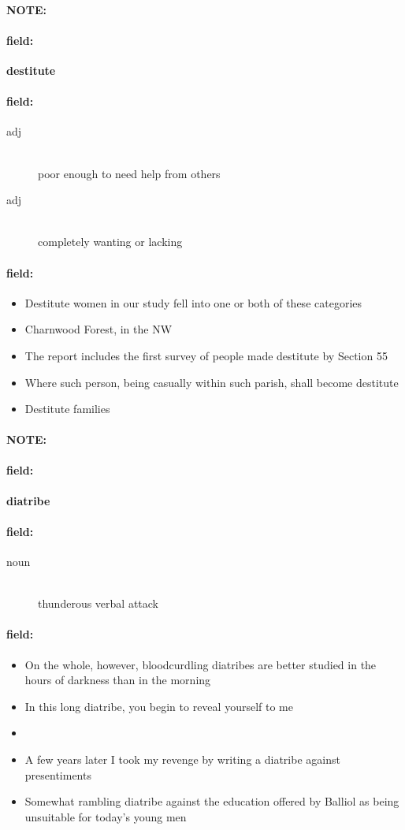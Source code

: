 \documentclass[12pt]{article}
\newenvironment{note}{\paragraph{NOTE:}}{}
\newenvironment{field}{\paragraph{field:}}{}
\begin{document}
\begin{note}
\begin{field}
\textbf{\large destitute}
\end{field}


\begin{field}
\begin{description}
\item[adj] \hfill \\ 
poor enough to need help from others

\item[adj] \hfill \\ 
completely wanting or lacking

\end{description}
\end{field}

\begin{field}
\begin{itemize}
\item Destitute women in our study fell into one or both of these categories
\item Charnwood Forest, in the NW
\item The report includes the first survey of people made destitute by Section 55
\item Where such person, being casually within such parish, shall become destitute
\item Destitute families
\end{itemize}
\end{field}
\end{note}
\begin{note}
\begin{field}
\textbf{\large diatribe}
\end{field}


\begin{field}
\begin{description}
\item[noun] \hfill \\ 
thunderous verbal attack

\end{description}
\end{field}

\begin{field}
\begin{itemize}
\item On the whole, however, bloodcurdling diatribes are better studied in the hours of darkness than in the morning
\item In this long diatribe, you begin to reveal yourself to me
\item 
\item A few years later I took my revenge by writing a diatribe against presentiments
\item Somewhat rambling diatribe against the education offered by Balliol as being unsuitable for today's young men
\end{itemize}
\end{field}
\end{note}
\end{document}
